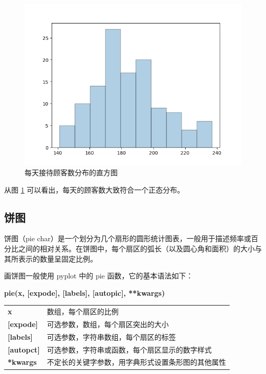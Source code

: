 \begin{figure}[!ht]
  \centering
  \includegraphics[scale=0.8]{figure/hist.png}
  \caption{每天接待顾客数分布的直方图}\label{fig:hist}
\end{figure}

从图 \ref{fig:hist} 可以看出，每天的顾客数大致符合一个正态分布。

\subsection{饼图}

饼图（pie char）是一个划分为几个扇形的圆形统计图表，一般用于描述频率或百分比之间的相对关系。在饼图中，每个扇区的弧长（以及圆心角和面积）的大小与其所表示的数量呈固定比例。

画饼图一般使用 pyplot 中的 pie 函数，它的基本语法如下：

\begin{center}
\begin{tcolorbox}[title = pie 函数的语法]
\textbf{pie(x, [expode], [labels], [autopic], **kwargs)}
\tcblower
\vspace{10pt}

\begin{tcboutputlisting}
\begin{tabular}{>{\bfseries}ll}
    x &数组，每个扇区的比例\\

    [expode] & 可选参数，数组，每个扇区突出的大小\\

  [labels] &可选参数，字符串数组，每个扇区的标签\\

  [autopct] &可选参数，字符串或函数，每个扇区显示的数字样式\\

**kwargs &不定长的关键字参数，用字典形式设置条形图的其他属性
\end{tabular}
\end{tcboutputlisting}
\tcbuselistingtext
\end{tcolorbox}
\end{center}

